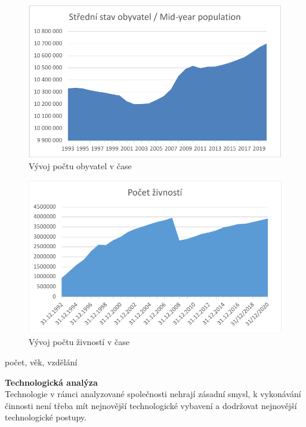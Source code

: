 \begin{figure}[!hbtp]
	\centering
	\includegraphics[width=0.8\linewidth]{Parts/InternalResources/CHART_Population_in_time.pdf}
	\caption[Vývoj počtu obyvatel v čase]{Vývoj počtu obyvatel v čase}
	\label{fig:Vyvoj poctu obyvatel v case}
\end{figure}

\newpage

\begin{figure}[!hbtp]
	\centering
	\includegraphics[width=0.8\linewidth]{Parts/InternalResources/CHART_Zivnosti_in_time.pdf}
	\caption[Vývoj počtu živností v čase]{Vývoj počtu živností v čase}
	\label{fig:Vyvoj poctu zivnosti v case}
\end{figure}

počet, věk, vzdělání

\newpage

\textbf{Technologická analýza}\\

Technologie v rámci analyzované společnosti nehrají zásadní smysl, k vykonávání činnosti není třeba mít nejnovější technologické vybavení a dodržovat nejnovější technologické postupy.\\

